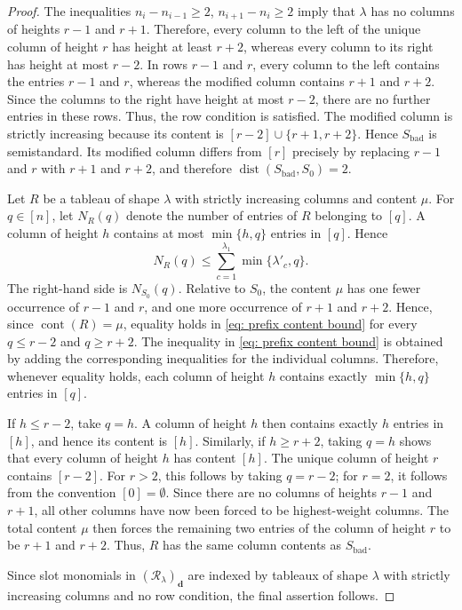 \documentclass[a4paper,reqno]{amsart}
\theoremstyle{plainnopunct}
\theoremstyle{definitionnopunct}
\newcommand{\cR}{\mathcal{R}}
\newcommand{\dist}{\operatorname{dist}}
\newcommand{\bd}{\mathbf{d}}
\DeclareMathOperator{\cont}{cont}
\begin{document}
\begin{proof}
The inequalities $n_i-n_{i-1}\geq2$, $n_{i+1}-n_i\geq2$ imply that $\lambda$ has no columns of heights $r-1$ and $r+1$.
Therefore, every column to the left of the unique column of height
$r$ has height at least $r+2$, whereas every column to its right has
height at most $r-2$. In rows $r-1$ and $r$, every column to the left contains the entries
$r-1$ and $r$, whereas the modified column contains $r+1$ and
$r+2$. Since the columns to the right have height at most $r-2$,
there are no further entries in these rows. Thus, the row condition
is satisfied. The modified column is strictly increasing because its
content is $[r-2]\cup\{r+1,r+2\}$.
Hence $S_{\mathrm{bad}}$ is semistandard. Its modified column differs
from $[r]$ precisely by replacing $r-1$ and $r$ with $r+1$ and
$r+2$, and therefore $\dist(S_{\mathrm{bad}},S_0)=2$.

Let $R$ be a tableau of shape $\lambda$ with strictly increasing
columns and content $\mu$. For $q\in[n]$, let $N_R(q)$ denote the
number of entries of $R$ belonging to $[q]$. A column of height $h$
contains at most $\min\{h,q\}$ entries in $[q]$. Hence
\begin{equation}
\label{eq: prefix content bound}
N_R(q)
\leq
\sum_{c=1}^{\lambda_1}
\min\{\lambda'_c,q\}.
\end{equation}
The right-hand side is $N_{S_0}(q)$. Relative to $S_0$, the content $\mu$ has one fewer occurrence of
$r-1$ and $r$, and one more occurrence of $r+1$ and $r+2$.
Hence, since $\cont(R)=\mu$, equality holds in
\eqref{eq: prefix content bound} for every $q\leq r-2$ and $q\geq r+2$. The inequality in \eqref{eq: prefix content bound} is obtained by
adding the corresponding inequalities for the individual columns.
Therefore, whenever equality holds, each column of height $h$ contains
exactly $\min\{h,q\}$ entries in $[q]$.

If $h\leq r-2$, take $q=h$. A column of height $h$ then contains
exactly $h$ entries in $[h]$, and hence its content is $[h]$.
Similarly, if $h\geq r+2$, taking $q=h$ shows that every column of
height $h$ has content $[h]$. The unique column of height $r$ contains $[r-2]$. For $r>2$, this
follows by taking $q=r-2$; for $r=2$, it follows from the convention
$[0]=\emptyset$. Since there are no columns of heights $r-1$ and
$r+1$, all other columns have now been forced to be highest-weight
columns. The total content $\mu$ then forces the remaining two
entries of the column of height $r$ to be $r+1$ and $r+2$. Thus, $R$ has the same column contents as $S_{\mathrm{bad}}$. 

Since slot monomials in $(\cR_\lambda)_{\bd}$ are indexed by tableaux of
shape $\lambda$ with strictly increasing columns and no row condition,
the final assertion follows.
\end{proof}
\end{document}
